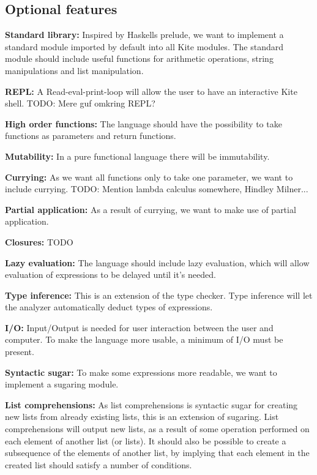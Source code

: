 \subsection{Optional features}

\textbf{Standard library:} Inspired by Haskells prelude, we want to
implement a standard module imported by default into all Kite
modules. The standard module should include useful functions for
arithmetic operations, string manipulations and list manipulation.

\textbf{REPL:} A Read-eval-print-loop will allow the user to have an
interactive Kite shell. TODO: Mere guf omkring REPL?

\textbf{High order functions:} The language should have the
possibility to take functions as parameters and return functions.

\textbf{Mutability:} In a pure functional language there will be
immutability.

\textbf{Currying:} As we want all functions only to take one
parameter, we want to include currying. TODO: Mention lambda calculus
somewhere, Hindley Milner...

\textbf{Partial application:} As a result of currying, we want to make
use of partial application.

\textbf{Closures:} TODO

\textbf{Lazy evaluation:} The language should include lazy evaluation,
which will allow evaluation of expressions to be delayed until it's needed.

\textbf{Type inference:} This is an extension of the type
checker. Type inference will let the analyzer automatically deduct
types of expressions. 

\textbf{I/O:} Input/Output is needed for user interaction between the
user and computer. To make the language more usable, a minimum of I/O
must be present.

\textbf{Syntactic sugar:} To make some expressions more readable, we want to
implement a sugaring module.

\textbf{List comprehensions:} As list comprehensions is syntactic
sugar for creating new lists from already existing lists, this is an
extension of sugaring. List comprehensions will output new lists, as a
result of some operation performed on each element of another list (or
lists). It should also be possible to create a subsequence of the
elements of another list, by implying that each element in the created
list should satisfy a number of conditions.

